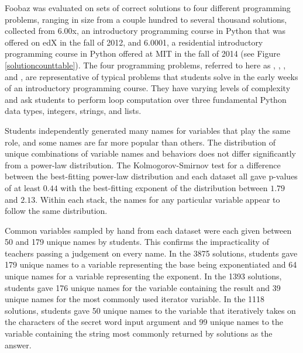 Foobaz was evaluated on sets of correct solutions to four different programming problems, ranging in size from a couple hundred to several thousand solutions, collected from 6.00x, an introductory programming course in Python that was offered on edX in the fall of 2012, and 6.0001, a residential introductory programming course in Python offered at MIT in the fall of 2014 (see Figure \ref{solutioncounttable}). The four programming problems, referred to here as , , , and , are representative of typical problems that students solve in the early weeks of an introductory programming course. They have varying levels of complexity and ask students to perform loop computation over three fundamental Python data types, integers, strings, and lists. 


Students independently generated many names for variables that play the same role, and some names are far more popular than others. The distribution of unique combinations of variable names and behaviors does not differ significantly from a power-law distribution. The Kolmogorov-Smirnov test for a difference between the best-fitting power-law distribution and each dataset all gave p-values of at least $0.44$ with the best-fitting exponent of the distribution between $1.79$ and $2.13$. Within each stack, the names for any particular variable appear to follow the same distribution.

Common variables sampled by hand from each dataset were each given between 50 and 179 unique names by students. This confirms the impracticality of teachers passing a judgement on every name. In the 3875  solutions, students gave 179 unique names to a variable representing the base being exponentiated and 64 unique names for a variable representing the exponent. In the 1393  solutions, students gave 176 unique names for the variable containing the result and 39 unique names for the most commonly used iterator variable. In the 1118  solutions, students gave 50 unique names to the variable that iteratively takes on the characters of the secret word input argument and 99 unique names to the variable containing the string most commonly returned by solutions as the answer. 

